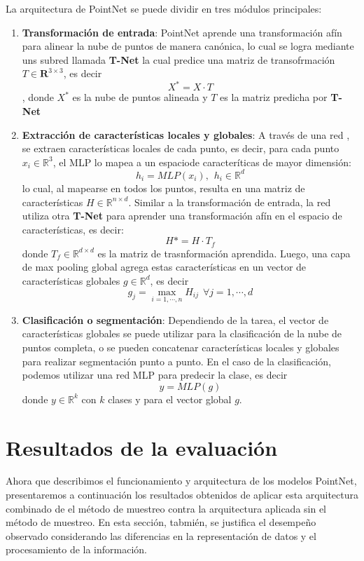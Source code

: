 La arquitectura de PointNet se puede dividir en tres módulos principales:

\begin{enumerate}
    \item \textbf{Transformación de entrada}: PointNet aprende una transformación afín para alinear la nube de puntos de manera canónica, lo cual se logra 
    mediante uns subred llamada \textbf{T-Net} la cual predice una matriz de transofrmación $T \in \mathbf{R}^{3 \times 3}$, es decir \[ X^{*} = X \cdot T\], donde
    $X^{*}$ es la nube de puntos alineada y $T$ es la matriz predicha por \textbf{T-Net}
    \item \textbf{Extracción de características locales y globales}: A través de una red , se extraen características locales de cada punto, es decir, para cada punto $x_i \in \mathbb{R}^3$,
     el MLP lo mapea a un espaciode caracteríticas de mayor dimensión: \[h_i = MLP(x_i) , \hspace{5pt} h_i \in \mathbb{R}^d\] 
     lo cual, al mapearse en todos los puntos, resulta en una matriz de características
    $H \in \mathbb{R}^{n \times d}$. Similar a la transformación de entrada, la red utiliza otra \textbf{T-Net} para aprender una transformación afín
    en el espacio de características, es decir: \[H* = H \cdot T_f\] donde $T_f \in \mathbb{R}^{d \times d}$ es la matriz de trasnformación aprendida.
    Luego, una capa de max pooling global agrega estas características en un vector de características globales $g \in \mathbb{R}^d$, es decir \[g_j = \max_{i = 1, \cdots ,n} H_{ij} \hspace{5pt} \forall j = 1, \cdots ,d \]
    \item \textbf{Clasificación o segmentación}: Dependiendo de la tarea, el vector de características globales se puede utilizar para la clasificación de la nube de puntos completa, o se pueden concatenar características locales y globales para realizar segmentación punto a punto.
    En el caso de la clasificación, podemos utilizar una red MLP para predecir la clase, es decir \[y = MLP(g)\] donde $y \in \mathbb{R}^k$ con $k$ clases y para el vector global $g$.

\end{enumerate}

\section{Resultados de la evaluación}

Ahora que describimos el funcionamiento y arquitectura de los modelos PointNet, presentaremos a continuación los resultados obtenidos de aplicar esta arquitectura combinado de el método de muestreo contra la arquitectura aplicada sin el método de muestreo. En esta sección, tabmién, se justifica el desempeño observado considerando las diferencias en la representación de datos y el procesamiento de la información.

